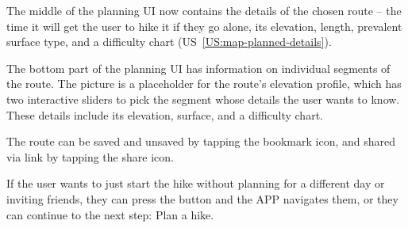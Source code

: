 The middle of the planning UI now contains the details of the chosen route -- the time it will get the user to hike it if they go alone, its elevation, length, prevalent surface type, and a difficulty chart (US~\ref{US:map-planned-details}).

The bottom part of the planning UI has information on individual segments of the route.
The picture is a placeholder for the route's elevation profile, which has two interactive sliders to pick the segment whose details the user wants to know.
These details include its elevation, surface, and a difficulty chart.

The route can be saved and unsaved by tapping the bookmark icon, and shared via link by tapping the share icon.

If the user wants to just start the hike without planning for a different day or inviting friends, they can press the  button and the APP navigates them,
or they can continue to the next step: Plan a hike.

